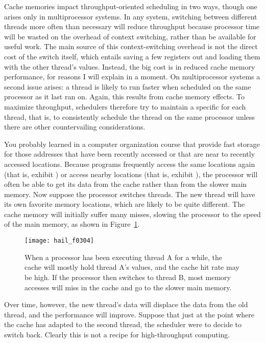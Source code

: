 Cache memories impact throughput-oriented scheduling in two ways,
though one arises only in multiprocessor systems.  In any system,
switching between different threads more often than necessary will
reduce throughput because processor time will be wasted on the
overhead of context switching, rather than be available for useful
work.  The main source of this context-switching overhead is not the
direct cost of the switch itself, which entails saving a few registers out and
loading them with the other thread's values.  Instead, the big cost is
in reduced cache memory performance, for reasons I will explain in a
moment.  On multiprocessor systems a second issue arises:
a thread is likely to run faster when scheduled on the same
processor as it last ran on.  Again, this results from cache memory effects.  To
maximize throughput, schedulers therefore try to maintain
a specific  for each thread,
that is, to consistently schedule the thread on the same processor
unless there are
other countervailing considerations.

You probably learned in a computer organization course that
 provide fast storage for those addresses that have been
recently accessed or that are near to recently accessed locations.
Because programs frequently access the same locations again (that is,
exhibit ) or access nearby locations
(that is, exhibit
), the processor will often be able to get its data
from the cache rather than from the slower main memory.  Now
suppose the processor switches threads.  The new thread will have its own favorite
memory locations, which are likely to be quite different.  The cache
memory will initially suffer many misses, slowing the processor to the
speed of the main memory, as shown in Figure~\ref{scan-3-2}.
\begin{figure}
\centerline{\texttt{[image: hail\_f0304]}}
\caption{When a processor has been executing thread A for a while, the
  cache will mostly hold thread A's values, and the cache hit rate may
  be high.  If the processor then
  switches to thread B, most memory accesses will miss in the cache
  and go to the slower main memory.}
\label{scan-3-2}
\end{figure}
Over time, however, the new thread's data
will displace the data from the old thread, and the performance will
improve.  Suppose that just at the point where the cache has adapted to
the second thread, the scheduler were to decide to
switch back.  Clearly this is not a recipe for high-throughput
computing.

